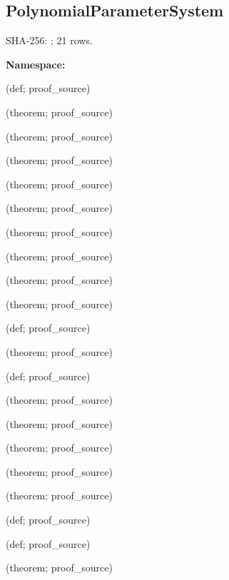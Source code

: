\subsection*{PolynomialParameterSystem}
{\footnotesize SHA-256: ; 21 rows.}\par
\begingroup\small
\textbf{Namespace:} \par
\noindent{} {\scriptsize (def; proof\_source)}\par
\noindent{} {\scriptsize (theorem; proof\_source)}\par
\noindent{} {\scriptsize (theorem; proof\_source)}\par
\noindent{} {\scriptsize (theorem; proof\_source)}\par
\noindent{} {\scriptsize (theorem; proof\_source)}\par
\noindent{} {\scriptsize (theorem; proof\_source)}\par
\noindent{} {\scriptsize (theorem; proof\_source)}\par
\noindent{} {\scriptsize (theorem; proof\_source)}\par
\noindent{} {\scriptsize (theorem; proof\_source)}\par
\noindent{} {\scriptsize (theorem; proof\_source)}\par
\noindent{} {\scriptsize (def; proof\_source)}\par
\noindent{} {\scriptsize (theorem; proof\_source)}\par
\noindent{} {\scriptsize (def; proof\_source)}\par
\noindent{} {\scriptsize (theorem; proof\_source)}\par
\noindent{} {\scriptsize (theorem; proof\_source)}\par
\noindent{} {\scriptsize (theorem; proof\_source)}\par
\noindent{} {\scriptsize (theorem; proof\_source)}\par
\noindent{} {\scriptsize (theorem; proof\_source)}\par
\noindent{} {\scriptsize (def; proof\_source)}\par
\noindent{} {\scriptsize (def; proof\_source)}\par
\noindent{} {\scriptsize (theorem; proof\_source)}\par
\endgroup
